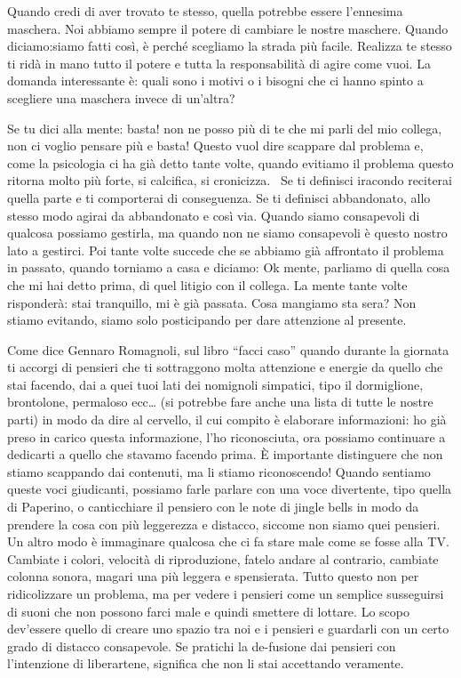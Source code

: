\documentclass[12pt]{book} %
\begin{document}
Quando credi di aver trovato te stesso, quella potrebbe essere l'ennesima maschera. \newline
Noi abbiamo sempre il potere di cambiare le nostre maschere. Quando diciamo:siamo fatti così, è perché scegliamo la
strada più facile. Realizza te stesso ti ridà in mano tutto il potere e tutta la responsabilità di agire come vuoi. La
domanda interessante è: quali sono i motivi o i bisogni che ci hanno spinto a scegliere una maschera invece di
un'altra?


\bigskip

Se tu dici alla mente: basta! non ne posso più di te che mi parli del mio collega, non ci voglio pensare più e basta!
Questo vuol dire scappare dal problema e, come la psicologia ci ha già detto tante volte, quando evitiamo il problema
questo ritorna molto più forte, si calcifica, si cronicizza. \ Se ti definisci iracondo reciterai quella parte e ti
comporterai di conseguenza. Se ti definisci abbandonato, allo stesso modo agirai da abbandonato e così via. Quando
siamo consapevoli di qualcosa possiamo gestirla, ma quando non ne siamo consapevoli è questo nostro lato a gestirci.
Poi tante volte succede che se abbiamo già affrontato il problema in passato, quando torniamo a casa e diciamo: Ok
mente, parliamo di quella cosa che mi hai detto prima, di quel litigio con il collega. La mente tante volte risponderà:
stai tranquillo, mi è già passata. Cosa mangiamo sta sera? Non stiamo evitando, siamo solo posticipando per dare
attenzione al presente.

Come dice Gennaro Romagnoli, sul libro “facci caso” quando durante la giornata ti accorgi di pensieri che ti sottraggono
molta attenzione e energie da quello che stai facendo, dai a quei tuoi lati dei nomignoli simpatici, tipo il
dormiglione, brontolone, permaloso ecc… (si potrebbe fare anche una lista di tutte le nostre parti) in modo da dire al
cervello, il cui compito è elaborare informazioni: ho già preso in carico questa informazione, l'ho riconosciuta, ora
possiamo continuare a dedicarti a quello che stavamo facendo prima. È importante distinguere che non stiamo scappando
dai contenuti, ma li stiamo riconoscendo! Quando sentiamo queste voci giudicanti, possiamo farle parlare con una voce
divertente, tipo quella di Paperino, o canticchiare il pensiero con le note di jingle bells in modo da prendere la cosa
con più leggerezza e distacco, siccome non siamo quei pensieri. Un altro modo è immaginare qualcosa che ci fa stare
male come se fosse alla TV. Cambiate i colori, velocità di riproduzione, fatelo andare al contrario, cambiate colonna
sonora, magari una più leggera e spensierata. Tutto questo non per ridicolizzare un problema, ma per vedere i pensieri
come un semplice susseguirsi di suoni che non possono farci male e quindi smettere di lottare. Lo scopo
dev'essere quello di creare uno spazio tra noi e i pensieri e guardarli con un certo grado di
distacco consapevole. Se pratichi la de-fusione dai pensieri con l'intenzione di liberartene,
significa che non li stai accettando veramente.
\end{document}
